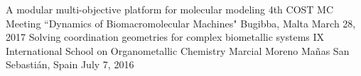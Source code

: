 \begin{cventries}
  \cventry
    {A modular multi-objective platform for molecular modeling} %
    {4th COST MC Meeting ``Dynamics of Biomacromolecular Machines"} %
    {Bugibba, Malta} %
    {March 28, 2017} %
    {}
  \cventry
    {Solving coordination geometries for complex biometallic systems} %
    {IX International School on Organometallic Chemistry Marcial Moreno Mañas} %
    {San Sebastián, Spain} %
    {July 7, 2016} %
    {}
\end{cventries}
